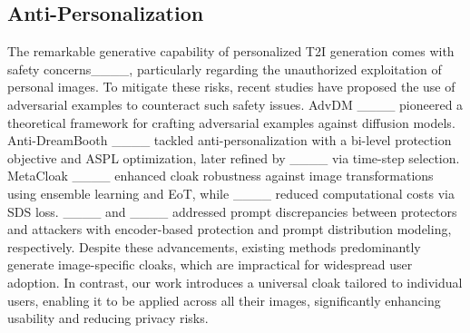  

\subsection{Anti-Personalization}
The remarkable generative capability of personalized T2I generation comes with safety concerns____, particularly regarding the unauthorized exploitation of personal images. 
To mitigate these risks, recent studies have proposed the use of adversarial examples to counteract such safety issues. 
AdvDM ____ pioneered a theoretical framework for crafting adversarial examples against diffusion models. 
Anti-DreamBooth ____ tackled anti-personalization with a bi-level protection objective and ASPL optimization, later refined by ____ via time-step selection. 
MetaCloak ____ enhanced cloak robustness against image transformations using ensemble learning and EoT, while ____ reduced computational costs via SDS loss. 
____ and ____ addressed prompt discrepancies between protectors and attackers with encoder-based protection and prompt distribution modeling, respectively.
Despite these advancements, existing methods predominantly generate image-specific cloaks, which are impractical for widespread user adoption. 
In contrast, our work introduces a universal cloak tailored to individual users, enabling it to be applied across all their images, significantly enhancing usability and reducing privacy risks.